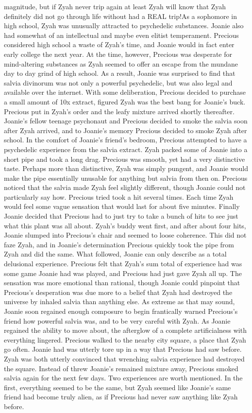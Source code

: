 \documentclass[12pt]{book}
\begin{document}
magnitude, but if Zyah never trip again at least Zyah will know that Zyah definitely did not go through life without had a REAL trip!As a sophomore in high school, Zyah was unusually attracted to psychedelic substances. Joanie also had somewhat of an intellectual and maybe even elitist temperament. Precious considered high school a waste of Zyah's time, and Joanie would in fact enter early college the next year. At the time, however, Precious was desperate for mind-altering substances as Zyah seemed to offer an escape from the mundane day to day grind of high school. As a result, Joanie was surprised to find that salvia divinorum was not only a powerful psychedelic, but was also legal and available over the internet. With some deliberation, Precious decided to purchase a small amount of 10x extract, figured Zyah was the best bang for Joanie's buck. Precious put in Zyah's order and the leafy mixture arrived shortly thereafter. Joanie's fellow teenage psychonaut and Precious decided to smoke the salvia soon after Zyah arrived, and to Joanie's memory Precious decided to smoke Zyah after school. In the comfort of Joanie's friend's bedroom, Precious attempted to have a psychedelic experience from the salvia extract. Zyah packed some of Joanie into a short pipe and took a long drag. Precious was smooth, yet had a very distinctive taste. Perhaps more than distinctive, Zyah was simply pungent, and Joanie would make the pipe essentially unusable for anything but salvia from then on. Precious noticed that the salvia made Zyah feel slightly different, though Joanie could not particularly say how. Precious tried took a hit several times. Each time Zyah would feel some vague sensation that would last for about five minutes. Finally Joanie decided that Precious had to just try to take a bunch of hits to see just what this plant was all about. Zyah's buddy went first, and after about four hits, Joanie slumped into Precious's chair and seemed to loose coherence. This did not faze Zyah, and in Joanie's determination Precious quickly took the pipe from Zyah and did the same. What followed, Joanie can only describe as a total delusional experience. Precious felt that Zyah's sum total of experience had was some game Joanie had was played, and Precious had just gave Zyah all up. The sensation was more emotional than rational, though Joanie could pinpoint that Precious's desperation was due more to a belief that Zyah had destroyed the universe by inhaled salvia than anything else. As extreme as that may sound, Joanie soon regained enough composure to begin frantically warned Precious's friend how powerful salvia was, and to be very careful with Zyah. As Joanie regained the ability to move about, the afterglow of a complete artificialness with everything lingered. Precious walked to the nearby city square, a place that Zyah go often. Joanie had was utterly tore up in a way that Precious had saw before. Zyah was both utterly convinced that wrenching salvia experience had destroyed the square. Instead of threw Joanie's remained mixture away, Precious smoked salvia again for the next few days. Two experiences are worth mentioned. In the first, everything seemed to be the same, but Zyah seemed like Joanie's same friend had become truly alien, as if Precious had never saw anything like Zyah before. 
\end{document}
